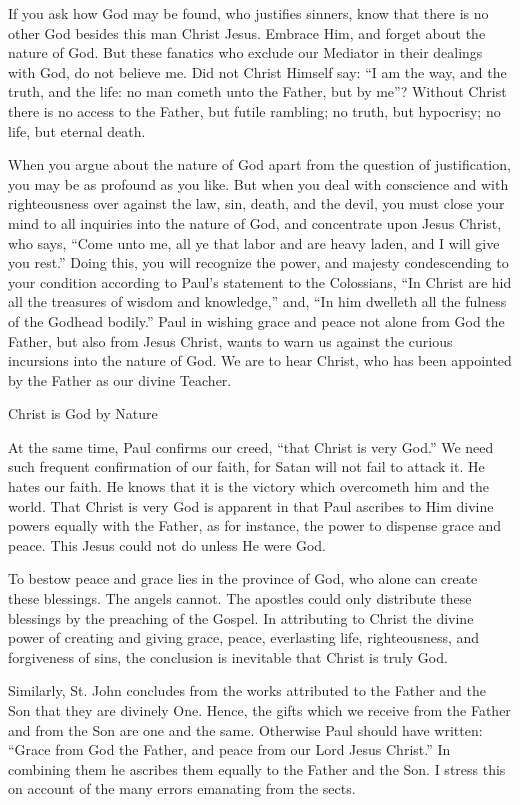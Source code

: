 If you ask how God may be found, who justifies sinners, know that there is no other God besides this man Christ Jesus. Embrace Him, and forget about the nature of God. But these fanatics who exclude our Mediator in their dealings with God, do not believe me. Did not Christ Himself say: “I am the way, and the truth, and the life: no man cometh unto the Father, but by me”? Without Christ there is no access to the Father, but futile rambling; no truth, but hypocrisy; no life, but eternal death.

When you argue about the nature of God apart from the question of justification, you may be as profound as you like. But when you deal with conscience and with righteousness over against the law, sin, death, and the devil, you must close your mind to all inquiries into the nature of God, and concentrate upon Jesus Christ, who says, “Come unto me, all ye that labor and are heavy laden, and I will give you rest.” Doing this, you will recognize the power, and majesty condescending to your condition according to Paul’s statement to the Colossians, “In Christ are hid all the treasures of wisdom and knowledge,” and, “In him dwelleth all the fulness of the Godhead bodily.” Paul in wishing grace and peace not alone from God the Father, but also from Jesus Christ, wants to warn us against the curious incursions into the nature of God. We are to hear Christ, who has been appointed by the Father as our divine Teacher.

Christ is God by Nature

At the same time, Paul confirms our creed, “that Christ is very God.” We need such frequent confirmation of our faith, for Satan will not fail to attack it. He hates our faith. He knows that it is the victory which overcometh him and the world. That Christ is very God is apparent in that Paul ascribes to Him divine powers equally with the Father, as for instance, the power to dispense grace and peace. This Jesus could not do unless He were God.

To bestow peace and grace lies in the province of God, who alone can create these blessings. The angels cannot. The apostles could only distribute these blessings by the preaching of the Gospel. In attributing to Christ the divine power of creating and giving grace, peace, everlasting life, righteousness, and forgiveness of sins, the conclusion is inevitable that Christ is truly God.

Similarly, St. John concludes from the works attributed to the Father and the Son that they are divinely One. Hence, the gifts which we receive from the Father and from the Son are one and the same. Otherwise Paul should have written: “Grace from God the Father, and peace from our Lord Jesus Christ.” In combining them he ascribes them equally to the Father and the Son. I stress this on account of the many errors emanating from the sects.

